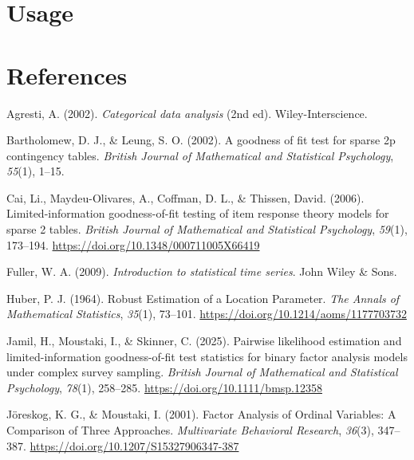 \documentclass[
  letterpaper,
  DIV=11,
  numbers=noendperiod]{scrartcl}
\newlength{\cslhangindent}
\newenvironment{CSLReferences}[2] %
 {\begin{list}{}{%
  \setlength{\itemindent}{0pt}
  \setlength{\leftmargin}{0pt}
  \setlength{\parsep}{0pt}
  \ifodd #1
   \setlength{\leftmargin}{\cslhangindent}
   \setlength{\itemindent}{-1\cslhangindent}
  \fi
  \setlength{\itemsep}{#2\baselineskip}}}
 {\end{list}}
\begin{document}
\section{Usage}\label{usage}

\section*{References}\label{references-1}

\label{refs}
\begin{CSLReferences}{1}{0}
Agresti, A. (2002). \emph{Categorical data analysis} (2nd ed).
Wiley-Interscience.

Bartholomew, D. J., \& Leung, S. O. (2002). A goodness of fit test for
sparse 2p contingency tables. \emph{British Journal of Mathematical and
Statistical Psychology}, \emph{55}(1), 1--15.

Cai, Li., Maydeu-Olivares, A., Coffman, D. L., \& Thissen, David.
(2006). Limited-information goodness-of-fit testing of item response
theory models for sparse 2 tables. \emph{British Journal of Mathematical
and Statistical Psychology}, \emph{59}(1), 173--194.
\url{https://doi.org/10.1348/000711005X66419}

Fuller, W. A. (2009). \emph{Introduction to statistical time series}.
John Wiley \& Sons.

Huber, P. J. (1964). Robust {Estimation} of a {Location Parameter}.
\emph{The Annals of Mathematical Statistics}, \emph{35}(1), 73--101.
\url{https://doi.org/10.1214/aoms/1177703732}

Jamil, H., Moustaki, I., \& Skinner, C. (2025). Pairwise likelihood
estimation and limited-information goodness-of-fit test statistics for
binary factor analysis models under complex survey sampling.
\emph{British Journal of Mathematical and Statistical Psychology},
\emph{78}(1), 258--285. \url{https://doi.org/10.1111/bmsp.12358}

Jöreskog, K. G., \& Moustaki, I. (2001). Factor {Analysis} of {Ordinal
Variables}: {A Comparison} of {Three Approaches}. \emph{Multivariate
Behavioral Research}, \emph{36}(3), 347--387.
\url{https://doi.org/10.1207/S15327906347-387}


\end{CSLReferences}
\end{document}
